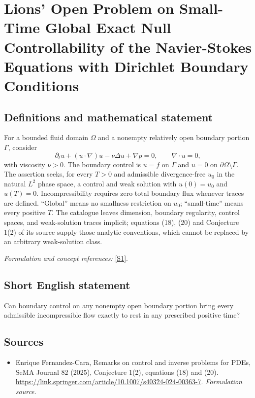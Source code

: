 \documentclass[11pt]{article}
\begin{document}
\section*{\texorpdfstring{Lions' Open Problem on Small-Time Global Exact Null Controllability of the Navier-Stokes Equations with Dirichlet Boundary Conditions}{Lions' Open Problem on Small-Time Global Exact Null Controllability of the Navier-Stokes Equations with Dirichlet Boundary Conditions}}\label{statement}
\subsection{Definitions and mathematical statement}
For a bounded fluid domain $\Omega$ and a nonempty relatively open boundary portion $\Gamma$, consider
\[
 \partial_tu+(u\cdot\nabla)u-\nu\Delta u+\nabla p=0,
 \qquad\nabla\cdot u=0,
\]
with viscosity $\nu>0$. The boundary control is $u=f$ on $\Gamma$ and $u=0$ on $\partial\Omega\setminus\Gamma$. The assertion seeks, for every $T>0$ and admissible divergence-free $u_0$ in the natural $L^2$ phase space, a control and weak solution with $u(0)=u_0$ and $u(T)=0$. Incompressibility requires zero total boundary flux whenever traces are defined. ``Global'' means no smallness restriction on $u_0$; ``small-time'' means every positive $T$. The catalogue leaves dimension, boundary regularity, control spaces, and weak-solution traces implicit; equations (18), (20) and Conjecture 1(2) of its source supply those analytic conventions, which cannot be replaced by an arbitrary weak-solution class.
\par\smallskip\textit{Formulation and concept references:} \href{https://link.springer.com/article/10.1007/s40324-024-00363-7}{[S1]}.

\subsection{Short English statement}
Can boundary control on any nonempty open boundary portion bring every admissible incompressible flow exactly to rest in any prescribed positive time?
\subsection{Sources}
\begin{itemize}
\item[S1]Enrique Fernandez-Cara, Remarks on control and inverse problems for PDEs, SeMA Journal 82 (2025), Conjecture 1(2), equations (18) and (20).
\url{https://link.springer.com/article/10.1007/s40324-024-00363-7}.
\textit{Formulation source.}
\end{itemize}
\end{document}
